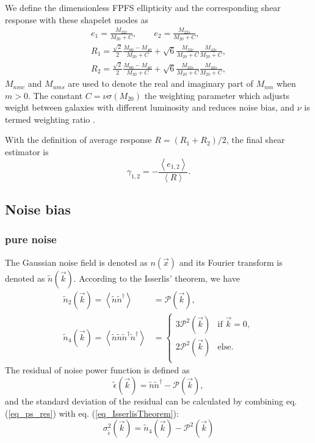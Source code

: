 We define the dimensionless FPFS ellipticity and the corresponding shear
response with these shapelet modes as
\begin{align}\label{ellipticity_define}
e_1=\frac{M_{22c}}{M_{20}+C},\qquad
e_2=\frac{M_{22s}}{M_{20}+C},\\
R_{1}=\frac{\sqrt{2}}{2}\frac{M_{00}-M_{40}}{M_{20}+C}
    +\sqrt{6}\frac{M_{22c}}{M_{20}+C}\frac{M_{42c}}{M_{20}+C},\\
R_{2}=\frac{\sqrt{2}}{2}\frac{M_{00}-M_{40}}{M_{20}+C}
    +\sqrt{6}\frac{M_{22s}}{M_{20}+C}\frac{M_{42s}}{M_{20}+C},
\end{align}
$M_{nmc}$ and $M_{nms}$ are used to denote the real and imaginary part of
$M_{nm}$ when $m>0$. The constant $C=\nu \sigma(M_{20})$ the weighting
parameter which adjusts weight between galaxies with different luminosity and
reduces noise bias, and $\nu$ is termed weighting ratio \citep{FPFS-Li2018}.

With the definition of average response $R= (R_1+R_2)/2$, the final shear
estimator is
\begin{equation}
\gamma_{1,2} =-\frac{\left\langle e_{1,2}
\right\rangle}{\left\langle R \right\rangle}.
\end{equation}

\subsection{Noise bias}
\label{sec_Method_noise}

\subsubsection{pure noise}

The Gaussian noise field is denoted as $n(\vec{x})$ and its Fourier transform
is denoted as $\tilde{n}(\vec{k})$. According to the Isserlis' theorem, we have
\begin{equation}\label{eq_IsserlisTheorem}
\begin{split}
    \tilde{n}_2(\vec{k})=\left\langle\tilde{n}\tilde{n}^{\dagger}\right\rangle
    &=\mathcal{P}(\vec{k}),\\
    \tilde{n}_4(\vec{k})=\left\langle\tilde{n}\tilde{n}\tilde{n}^\dagger\tilde{n}^\dagger\right\rangle
    &=
    \begin{cases}
    3\mathcal{P}^2(\vec{k}) &\mbox{if } \vec{k}=0,\\
    2\mathcal{P}^2(\vec{k}) &\mbox{else}.\\
    \end{cases}
\end{split}
\end{equation}
The residual of noise power function is defined as
\begin{equation}\label{eq_ps_res}
    \tilde{\epsilon}(\vec{k})=\tilde{n}\tilde{n}^\dagger
    -\mathcal{P}(\vec{k}),
\end{equation}
and the standard deviation of the residual can be calculated by combining
eq.(\ref{eq_ps_res}) with eq.  (\ref{eq_IsserlisTheorem}):
\begin{equation}
    \sigma^2_{\tilde{\epsilon}}(\vec{k})=\tilde{n}_4(\vec{k})-\mathcal{P}^2(\vec{k})
\end{equation}

